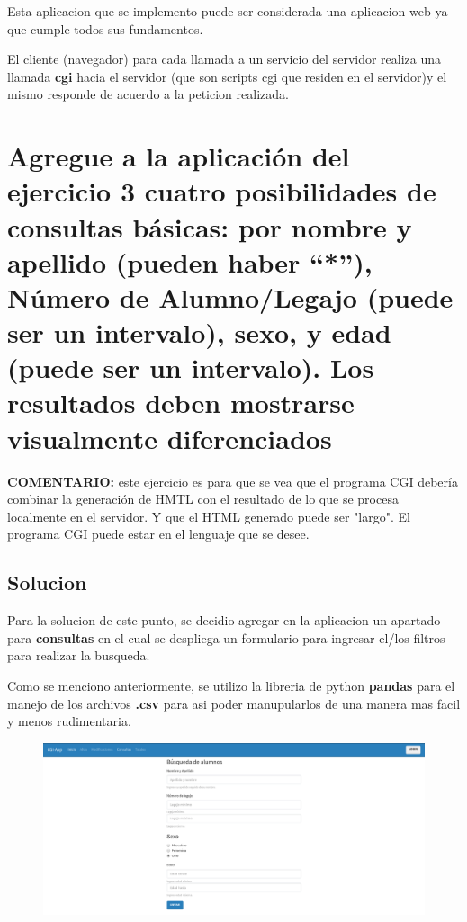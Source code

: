 \documentclass[12pt]{extarticle}
\begin{document}
Esta aplicacion que se implemento puede ser considerada una aplicacion
web ya que cumple todos sus fundamentos.

El cliente (navegador) para cada llamada a un servicio del servidor
realiza una llamada \textbf{cgi} hacia el servidor (que son scripts cgi
que residen en el servidor)y el mismo responde de acuerdo a la peticion
realizada.

    \section{Agregue a la aplicación del ejercicio 3 cuatro posibilidades de
consultas básicas: por nombre y apellido (pueden haber ``*''), Número de
Alumno/Legajo (puede ser un intervalo), sexo, y edad (puede ser un
intervalo). Los resultados deben mostrarse visualmente
diferenciados}\label{agregue-a-la-aplicaciuxf3n-del-ejercicio-3-cuatro-posibilidades-de-consultas-buxe1sicas-por-nombre-y-apellido-pueden-haber-nuxfamero-de-alumnolegajo-puede-ser-un-intervalo-sexo-y-edad-puede-ser-un-intervalo.-los-resultados-deben-mostrarse-visualmente-diferenciados}

\textbf{COMENTARIO:} este ejercicio es para que se vea que el programa
CGI debería combinar la generación de HMTL con el resultado de lo que se
procesa localmente en el servidor. Y que el HTML generado puede ser
"largo". El programa CGI puede estar en el lenguaje que se desee.

    \subsection{Solucion}\label{solucion}

Para la solucion de este punto, se decidio agregar en la aplicacion un
apartado para \textbf{consultas} en el cual se despliega un formulario
para ingresar el/los filtros para realizar la busqueda.

Como se menciono anteriormente, se utilizo la libreria de python
\textbf{pandas} para el manejo de los archivos \textbf{.csv} para asi
poder manupularlos de una manera mas facil y menos rudimentaria.

\begin{figure}
\centering
\includegraphics{images/consultas.png}
\caption{}
\end{figure}
\end{document}
